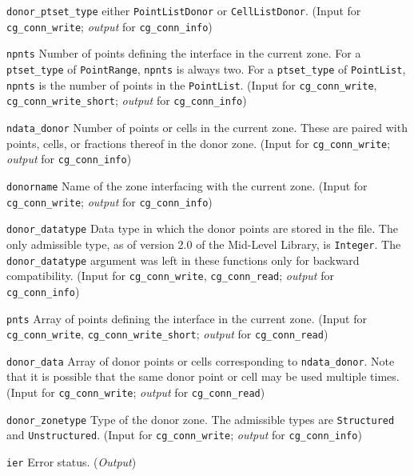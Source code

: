 \begin{Ventryi}{\texttt{donor\_ptset\_type}}
      either \texttt{PointListDonor} or \texttt{CellListDonor}.
      (\textcolor{input}{Input} for \texttt{cg\_conn\_write};
      \textcolor{output}{\textit{output}} for \texttt{cg\_conn\_info})
\item [\texttt{npnts}]
      Number of points defining the interface in the current zone.
      For a \texttt{ptset\_type} of \texttt{PointRange}, \texttt{npnts}
      is always two.
      For a \texttt{ptset\_type} of \texttt{PointList}, \texttt{npnts} is
      the number of points in the \texttt{PointList}.
      (\textcolor{input}{Input} for \texttt{cg\_conn\_write},
      \texttt{cg\_conn\_write\_short};
      \textcolor{output}{\textit{output}} for \texttt{cg\_conn\_info})
\item [\texttt{ndata\_donor}]
      Number of points or cells in the current zone.
      These are paired with points, cells, or fractions thereof in the
      donor zone.
      (\textcolor{input}{Input} for \texttt{cg\_conn\_write};
      \textcolor{output}{\textit{output}} for \texttt{cg\_conn\_info})
\item [\texttt{donorname}]
      Name of the zone interfacing with the current zone.
      (\textcolor{input}{Input} for \texttt{cg\_conn\_write};
      \textcolor{output}{\textit{output}} for \texttt{cg\_conn\_info})
\item [\texttt{donor\_datatype}]
      Data type in which the donor points are stored in the file.
      The only admissible type, as of version 2.0 of the Mid-Level
      Library, is \texttt{Integer}.
      The \texttt{donor\_datatype} argument was left in these functions
      only for backward compatibility.
      (\textcolor{input}{Input} for \texttt{cg\_conn\_write},
      \texttt{cg\_conn\_read};
      \textcolor{output}{\textit{output}} for \texttt{cg\_conn\_info})
\item [\texttt{pnts}]
      Array of points defining the interface in the current zone.
      (\textcolor{input}{Input} for \texttt{cg\_conn\_write},
      \texttt{cg\_conn\_write\_short};
      \textcolor{output}{\textit{output}} for \texttt{cg\_conn\_read})
\item [\texttt{donor\_data}]
      Array of donor points or cells corresponding to
      \texttt{ndata\_donor}.
      Note that it is possible that the same donor point or cell may
      be used multiple times.
      (\textcolor{input}{Input} for \texttt{cg\_conn\_write};
      \textcolor{output}{\textit{output}} for \texttt{cg\_conn\_read})
\item [\texttt{donor\_zonetype}]
      Type of the donor zone.
      The admissible types are \texttt{Structured} and \texttt{Unstructured}.
      (\textcolor{input}{Input} for \texttt{cg\_conn\_write};
      \textcolor{output}{\textit{output}} for \texttt{cg\_conn\_info})
\item [\texttt{ier}]
      Error status.
      (\textcolor{output}{\textit{Output}})
\end{Ventryi}

